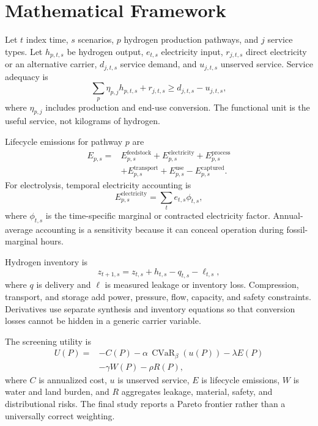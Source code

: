 \documentclass[conference]{IEEEtran}
\newcommand{\cvar}{\operatorname{CVaR}}
\begin{document}
\section{Mathematical Framework}
\label{sec:model}
Let $t$ index time, $s$ scenarios, $p$ hydrogen production pathways, and $j$ service types. Let $h_{p,t,s}$ be hydrogen output, $e_{t,s}$ electricity input, $r_{j,t,s}$ direct electricity or an alternative carrier, $d_{j,t,s}$ service demand, and $u_{j,t,s}$ unserved service. Service adequacy is
\begin{equation}
\sum_p \eta_{p,j}h_{p,t,s}+r_{j,t,s}\ge d_{j,t,s}-u_{j,t,s},
\label{eq:adequacy}
\end{equation}
where $\eta_{p,j}$ includes production and end-use conversion. The functional unit is the useful service, not kilograms of hydrogen.

Lifecycle emissions for pathway $p$ are
\begin{equation}
\begin{aligned}
E_{p,s}={}&E^{\mathrm{feedstock}}_{p,s}+E^{\mathrm{electricity}}_{p,s}
 +E^{\mathrm{process}}_{p,s}\\
&+E^{\mathrm{transport}}_{p,s}+E^{\mathrm{use}}_{p,s}
 -E^{\mathrm{captured}}_{p,s}.
\end{aligned}
\label{eq:lifecycle}
\end{equation}
For electrolysis, temporal electricity accounting is
\begin{equation}
E^{\mathrm{electricity}}_{p,s}=\sum_t e_{t,s}\phi_{t,s},
\label{eq:temporal}
\end{equation}
where $\phi_{t,s}$ is the time-specific marginal or contracted electricity factor. Annual-average accounting is a sensitivity because it can conceal operation during fossil-marginal hours.

Hydrogen inventory is
\begin{equation}
z_{t+1,s}=z_{t,s}+h_{t,s}-q_{t,s}-\ell_{t,s},
\label{eq:inventory}
\end{equation}
where $q$ is delivery and $\ell$ is measured leakage or inventory loss. Compression, transport, and storage add power, pressure, flow, capacity, and safety constraints. Derivatives use separate synthesis and inventory equations so that conversion losses cannot be hidden in a generic carrier variable.

The screening utility is
\begin{equation}
\begin{aligned}
U(P)={}&-C(P)-\alpha\,\cvar_{\beta}(u(P))-\lambda E(P)\\
&-\gamma W(P)-\rho R(P),
\end{aligned}
\label{eq:utility}
\end{equation}
where $C$ is annualized cost, $u$ is unserved service, $E$ is lifecycle emissions, $W$ is water and land burden, and $R$ aggregates leakage, material, safety, and distributional risks. The final study reports a Pareto frontier rather than a universally correct weighting.
\end{document}
